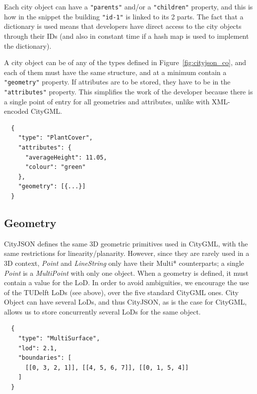 %

Each city object can have a \texttt{"parents"} and/or a \texttt{"children"} property, and this is how in the snippet the building \texttt{"id-1"} is linked to its 2 parts.
The fact that a dictionary is used means that developers have direct access to the city objects through their IDs (and also in constant time if a hash map is used to implement the dictionary).

%

A city object can be of any of the types defined in Figure~\ref{fig:cityjson_co}, and each of them must have the same structure, and at a minimum contain a \texttt{"geometry"} property. 
If attributes are to be stored, they have to be in the \texttt{"attributes"} property.
This simplifies the work of the developer because there is a single point of entry for all geometries and attributes, unlike with XML-encoded CityGML\@.
\begin{lstlisting}
  {
    "type": "PlantCover",
    "attributes": {
      "averageHeight": 11.05,
      "colour": "green"
    },
    "geometry": [{...}]
  }
\end{lstlisting}


\subsection{Geometry}

CityJSON defines the same 3D geometric primitives used in CityGML, with the same restrictions for linearity/planarity.
However, since they are rarely used in a 3D context, \emph{Point} and \emph{LineString} only have their Multi* counterparts; a single \emph{Point} is a \emph{MultiPoint} with only one object.
When a geometry is defined, it must contain a value for the LoD. 
In order to avoid ambiguities, we encourage the use of the TUDelft LoDs (see above), over the five standard CityGML ones.
City Object can have several LoDs, and thus CityJSON, as is the case for CityGML, allows us to store concurrently several LoDs for the same object.
\begin{lstlisting}
  {
    "type": "MultiSurface",
    "lod": 2.1,
    "boundaries": [
      [[0, 3, 2, 1]], [[4, 5, 6, 7]], [[0, 1, 5, 4]]
    ]
  }
\end{lstlisting}

